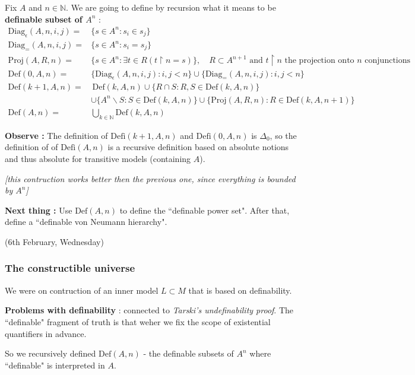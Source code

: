 \documentclass[12pt,a4paper]{article}
\begin{document}
 Fix $A$ and $n\in \mathbb{N}$. We are going to define by recursion what it means to be \textbf{definable subset of $A^n$} :
\begin{align*}
\text{Diag}_{\epsilon}(A, n, i,j) = &\{ s\in A^n : s_i \in s_j \}\\
\text{Diag}_{=}(A, n, i,j) = &\{ s\in A^n : s_i = s_j \}\\
\text{Proj}(A, R,n) = &\{ s\in A^n : \exists t\in R (t \upharpoonright n = s) \}, \quad R\subset A^{n+1} \text{ and } t \upharpoonright n \text{ the projection onto } n \text{ conjunctions}\\
\text{Def}(0, A, n) = &\{ \text{Diag}_{\epsilon}(A, n, i,j) : i,j < n\} \cup \{\text{Diag}_{=}(A, n, i,j) : i,j<n \} \\
\text{Def}(k+1, A, n) = & \,\text{Def}(k, A, n) \cup \{R\cap S : R,S\in \text{Def}(k, A, n)\} \\
&\cup \{ A^n \backslash S : S\in \text{Def}(k, A, n) \} \cup \{ \text{Proj}(A, R,n) : R\in \text{Def}(k, A, n+1) \} \\
\text{Def}(A,n) = &\bigcup_{k\in \mathbb{N}} \text{Def}(k, A, n)
\end{align*}
\s

\textbf{Observe :} The definition of $\text{Defi}(k+1, A,n)$ and $\text{Defi}(0, A,n)$ is $\Delta_0$, so the definition of of $\text{Defi}(A,n)$ is a recursive definition based on absolute notions and thus absolute for transitive models (containing $A$).

\emph{[this contruction works better then the previous one, since everything is bounded by $A^n$]}
\s

\textbf{Next thing :} Use $\text{Def}(A, n)$ to define the ``definable power set". After that, define a ``definable von Neumann hierarchy".
\s

\newday

(6th February, Wednesday)
\s

\subsubsection*{The constructible universe}

We were on contruction of an inner model $L\subset M$ that is based on definability.

\textbf{Problems with definability} : connected to \emph{Tarski's undefinability proof}. The ``definable" fragment of truth is that weher we fix the scope of existential quantifiers in advance. 

\quad So we recursively defined $\text{Def}(A, n)$ - the definable subsets of $A^n$ where ``definable" is interpreted in $A$.
\s
\end{document}

